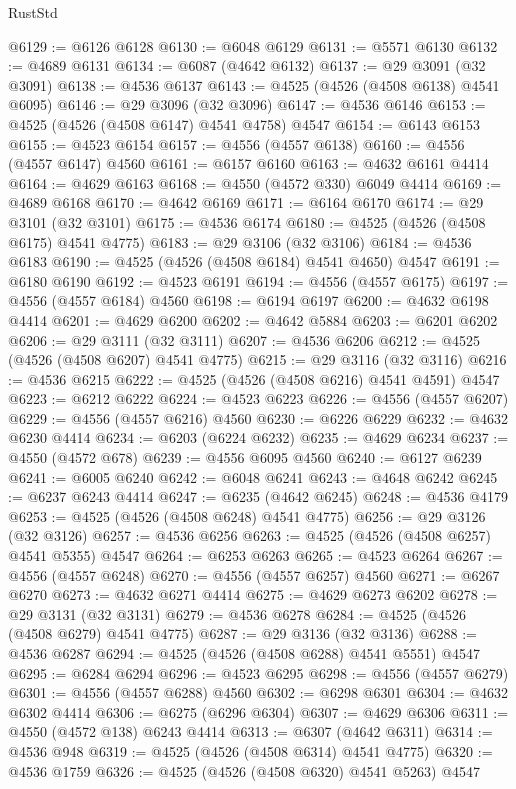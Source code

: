 \begin{lexlean}{RustStd}
\begin{coremodule}
{\begin{coremodule}
{{{{{{{{{{{{{{{{{{{{{{{{{{{{{{{{{{{{{{{{{{{{{{{{{{{{{{{@6129 := @6126 @6128
@6130 := @6048 @6129
@6131 := @5571 @6130
@6132 := @4689 @6131
@6134 := @6087 (@4642 @6132)
@6137 := @29 @3091 (@32 @3091)
@6138 := @4536 @6137
@6143 := @4525 (@4526 (@4508 @6138) @4541 @6095)
@6146 := @29 @3096 (@32 @3096)
@6147 := @4536 @6146
@6153 := @4525 (@4526 (@4508 @6147) @4541 @4758) @4547
@6154 := @6143 @6153
@6155 := @4523 @6154
@6157 := @4556 (@4557 @6138)
@6160 := @4556 (@4557 @6147) @4560
@6161 := @6157 @6160
@6163 := @4632 @6161 @4414
@6164 := @4629 @6163
@6168 := @4550 (@4572 @330) @6049 @4414
@6169 := @4689 @6168
@6170 := @4642 @6169
@6171 := @6164 @6170
@6174 := @29 @3101 (@32 @3101)
@6175 := @4536 @6174
@6180 := @4525 (@4526 (@4508 @6175) @4541 @4775)
@6183 := @29 @3106 (@32 @3106)
@6184 := @4536 @6183
@6190 := @4525 (@4526 (@4508 @6184) @4541 @4650) @4547
@6191 := @6180 @6190
@6192 := @4523 @6191
@6194 := @4556 (@4557 @6175)
@6197 := @4556 (@4557 @6184) @4560
@6198 := @6194 @6197
@6200 := @4632 @6198 @4414
@6201 := @4629 @6200
@6202 := @4642 @5884
@6203 := @6201 @6202
@6206 := @29 @3111 (@32 @3111)
@6207 := @4536 @6206
@6212 := @4525 (@4526 (@4508 @6207) @4541 @4775)
@6215 := @29 @3116 (@32 @3116)
@6216 := @4536 @6215
@6222 := @4525 (@4526 (@4508 @6216) @4541 @4591) @4547
@6223 := @6212 @6222
@6224 := @4523 @6223
@6226 := @4556 (@4557 @6207)
@6229 := @4556 (@4557 @6216) @4560
@6230 := @6226 @6229
@6232 := @4632 @6230 @4414
@6234 := @6203 (@6224 @6232)
@6235 := @4629 @6234
@6237 := @4550 (@4572 @678)
@6239 := @4556 @6095 @4560
@6240 := @6127 @6239
@6241 := @6005 @6240
@6242 := @6048 @6241
@6243 := @4648 @6242
@6245 := @6237 @6243 @4414
@6247 := @6235 (@4642 @6245)
@6248 := @4536 @4179
@6253 := @4525 (@4526 (@4508 @6248) @4541 @4775)
@6256 := @29 @3126 (@32 @3126)
@6257 := @4536 @6256
@6263 := @4525 (@4526 (@4508 @6257) @4541 @5355) @4547
@6264 := @6253 @6263
@6265 := @4523 @6264
@6267 := @4556 (@4557 @6248)
@6270 := @4556 (@4557 @6257) @4560
@6271 := @6267 @6270
@6273 := @4632 @6271 @4414
@6275 := @4629 @6273 @6202
@6278 := @29 @3131 (@32 @3131)
@6279 := @4536 @6278
@6284 := @4525 (@4526 (@4508 @6279) @4541 @4775)
@6287 := @29 @3136 (@32 @3136)
@6288 := @4536 @6287
@6294 := @4525 (@4526 (@4508 @6288) @4541 @5551) @4547
@6295 := @6284 @6294
@6296 := @4523 @6295
@6298 := @4556 (@4557 @6279)
@6301 := @4556 (@4557 @6288) @4560
@6302 := @6298 @6301
@6304 := @4632 @6302 @4414
@6306 := @6275 (@6296 @6304)
@6307 := @4629 @6306
@6311 := @4550 (@4572 @138) @6243 @4414
@6313 := @6307 (@4642 @6311)
@6314 := @4536 @948
@6319 := @4525 (@4526 (@4508 @6314) @4541 @4775)
@6320 := @4536 @1759
@6326 := @4525 (@4526 (@4508 @6320) @4541 @5263) @4547
}}}}}}}}}}}}}}}}}}}}}}}}}}}}}}}}}}}}}}}}}}}}}}}}}}}}}}}
\end{coremodule}}
\end{coremodule}
\end{lexlean}
